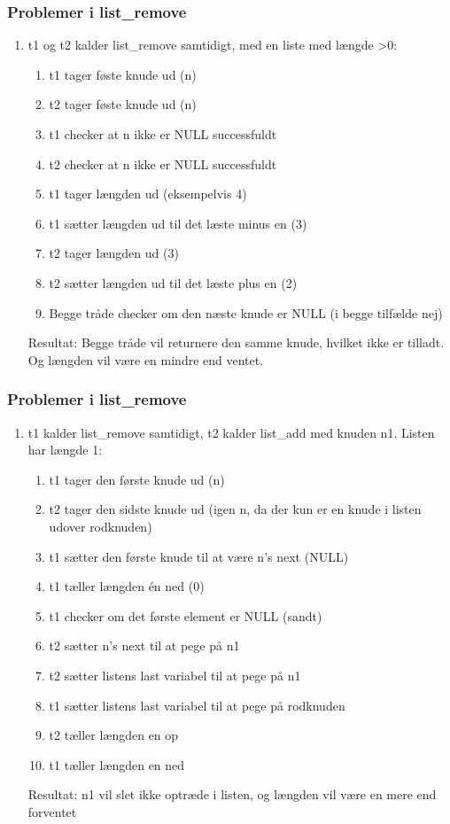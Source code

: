 \subsubsection*{Problemer i list\_remove}
\begin{enumerate}
\item t1 og t2 kalder list\_remove samtidigt, med en liste med længde >0:
	\begin{enumerate}
		\item t1 tager føste knude ud (n)
		\item t2 tager føste knude ud (n)
		\item t1 checker at n ikke er NULL successfuldt
		\item t2 checker at n ikke er NULL successfuldt
		\item t1 tager længden ud (eksempelvis 4)
		\item t1 sætter længden ud til det læste minus en (3)
		\item t2 tager længden ud (3)
		\item t2 sætter længden ud til det læste plus en (2)
		\item Begge tråde checker om den næste knude er NULL (i begge tilfælde nej)
   \end{enumerate}
	Resultat: Begge tråde vil returnere den samme knude, hvilket ikke er tilladt. Og længden vil være en mindre end ventet.
\end{enumerate}

\subsubsection*{Problemer i list\_remove}
\begin{enumerate}
\item t1 kalder list\_remove samtidigt, t2 kalder list\_add med knuden n1. Listen har længde 1:
	\begin{enumerate}
		\item t1 tager den første knude ud (n)
		\item t2 tager den sidste knude ud (igen n, da der kun er en knude i listen udover rodknuden)
		\item t1 sætter den første knude til at være n's next (NULL)
		\item t1 tæller længden én ned (0)
		\item t1 checker om det første element er NULL (sandt)
		\item t2 sætter n's next til at pege på n1
		\item t2 sætter listens last variabel til at pege på n1
		\item t1 sætter listens last variabel til at pege på rodknuden
		\item t2 tæller længden en op
		\item t1 tæller længden en ned
	\end{enumerate}
	Resultat: n1 vil slet ikke optræde i listen, og længden vil være en mere end forventet
\end{enumerate}


